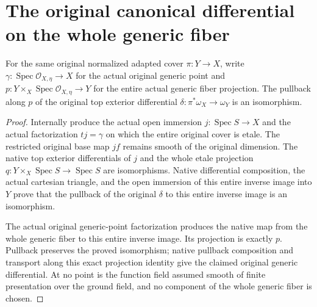 \section{The original canonical differential on the whole generic fiber}

\begin{theorem}
\label{thm:kn-canonical-original-generic-differential-iso}
\leanok
For the same original normalized adapted cover $\pi:Y\to X$, write
$\gamma:\operatorname{Spec}\mathcal O_{X,\eta}\to X$ for the actual
original generic point and $p:Y\times_X\operatorname{Spec}
\mathcal O_{X,\eta}\to Y$ for the entire actual generic fiber projection.
The pullback along $p$ of the original top exterior differential
$\delta:\pi^*\omega_X\to\omega_Y$ is an isomorphism.
\end{theorem}
\begin{proof}
Internally produce the actual open immersion $j:\operatorname{Spec}S\to X$
and the actual factorization $t j=\gamma$ on which the entire original
cover is etale. The restricted original base map $j f$ remains smooth of
the original dimension. The native top exterior differentials of $j$
and the whole etale projection $q:Y\times_X\operatorname{Spec}S\to
\operatorname{Spec}S$ are isomorphisms. Native differential composition,
the actual cartesian triangle, and the open immersion of this entire
inverse image into $Y$ prove that the pullback of the original $\delta$
to this entire inverse image is an isomorphism.

The actual original generic-point factorization produces the native
map from the whole generic fiber to this entire inverse image. Its
projection is exactly $p$. Pullback preserves the proved isomorphism;
native pullback composition and transport along this exact projection
identity give the claimed original generic differential. At no point
is the function field assumed smooth of finite presentation over the
ground field, and no component of the whole generic fiber is chosen.
\end{proof}
